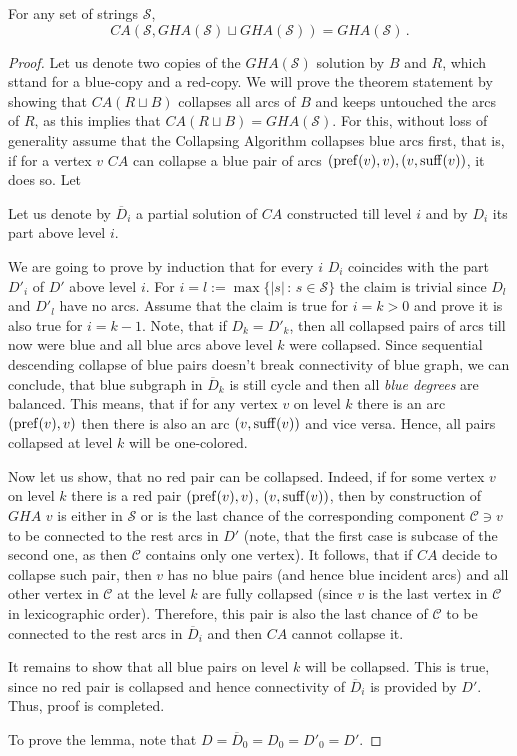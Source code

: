  \begin{theorem}
For any set of strings $\mathcal{S}$,
\[
			CA(\mathcal{S}, GHA(\mathcal{S}) \sqcup GHA(\mathcal{S})) = GHA(\mathcal{S}) \, .
\]
\end{theorem}
\begin{proof}
Let us denote two copies of the $GHA(\mathcal{S})$ solution by $B$ and $R$, which sttand for a blue-copy and a red-copy. We will prove the theorem statement by showing that $CA(R \sqcup B)$ collapses all arcs of $B$ and keeps untouched the arcs of $R$, as this implies that $CA(R \sqcup B)=GHA(\mathcal{S})$. For this, without loss of generality assume that the Collapsing Algorithm collapses blue arcs first, that is, if for a vertex $v$ $CA$ can collapse a blue pair of arcs $(\operatorname{pref}(v), v), (v, \operatorname{suff}(v))$, it does so. Let 

  Let us denote by $\overline{D}_i$ a partial solution of $CA$ constructed till level $i$ and by $D_i$ its part above level $i$. 	
	
	We are going to prove by induction that for every $i$ $D_i$ coincides with the part $D'_i$ of $D'$ above level $i$. For $i = l := \max\{|s| \, : \, s\in\mathcal{S}\}$ the claim is trivial since $D_l$ and $D'_l$ have no arcs. Assume that the claim is true for $i = k > 0$ and prove it is also true for $i = k - 1$. Note, that if $D_k = D'_k$, then all collapsed pairs of arcs till now were blue and all blue arcs above level $k$ were collapsed. Since sequential descending collapse of blue pairs doesn't break connectivity of blue graph, we can conclude, that blue subgraph in $\overline{D}_k$ is still cycle and then all {\em blue degrees} are balanced. This means, that if for any vertex $v$ on level $k$ there is an arc $(\operatorname{pref}(v), v)$ then there is also an arc $(v, \operatorname{suff}(v))$ and vice versa. Hence, all pairs collapsed at level $k$ will be one-colored.
	
	Now let us show, that no red pair can be collapsed. Indeed, if for some vertex $v$ on level $k$ there is a red pair $(\operatorname{pref}(v), v)$, $(v, \operatorname{suff}(v))$, then by construction of $GHA$ $v$ is either in $\mathcal{S}$ or is the last chance of the corresponding component $\mathcal{C} \ni v$ to be connected to the rest arcs in $D'$ (note, that the first case is subcase of the second one, as then $\mathcal{C}$ contains only one vertex). It follows, that if $CA$ decide to collapse such pair, then $v$ has no blue pairs (and hence blue incident arcs) and all other vertex in $\mathcal{C}$ at the level $k$ are fully collapsed (since $v$ is the last vertex in $\mathcal{C}$ in lexicographic order). Therefore, this pair is also the last chance of $\mathcal{C}$ to be connected to the rest arcs in $\overline{D}_i$ and then $CA$ cannot collapse it.
	
	It remains to show that all blue pairs on level $k$ will be collapsed. This is true, since no red pair is collapsed and hence connectivity of $\overline{D}_i$ is provided by $D'$. Thus, proof is completed.
	
	To prove the lemma, note that $D = \overline{D}_0 = D_0 = D'_0 = D'$.
\end{proof}


